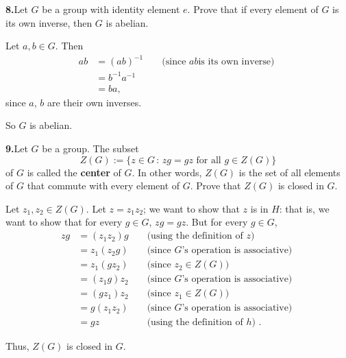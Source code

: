 \documentclass[10pt,]{book}
\newcommand{\terminology}[1]{\textbf{#1}}
\theoremstyle{plain}
\theoremstyle{definition}
\theoremstyle{definition}
\theoremstyle{definition}
\theoremstyle{definition}
\numberwithin{equation}{section}
\newcommand{\amp}{&}
\begin{document}
\par\smallskip
\noindent\textbf{8.}\quad{}Let \(G\) be a group with identity element \(e\). Prove that if every element of \(G\) is its own inverse, then \(G\) is abelian.%
\par\smallskip
Let \(a,b\in G\). Then%
%
\begin{align*}
ab\amp =(ab)^{-1}\amp \amp \text{ (since \(ab\)
is its own inverse) }\\
\amp =b^{-1}a^{-1}\amp \amp\\
\amp =ba, \amp
\end{align*}
since \(a\), \(b\) are their own inverses.%
\par
So \(G\) is abelian.%
\par\smallskip
\noindent\textbf{9.}\quad{}Let \(G\) be a group. The subset%
\begin{equation*}
Z(G):=\{z \in G\,:\, zg=gz \mbox{ for all } g\in Z(G)\}
\end{equation*}
of \(G\) is called the \terminology{center} of \(G\). In other words, \(Z(G)\) is the set of all elements of \(G\) that commute with every element of \(G\). Prove that \(Z(G)\) is closed in \(G\).%
\par\smallskip
Let \(z_1, z_2\in Z(G)\). Let \(z=z_1z_2\); we want to show that \(z\) is in \(H\): that is, we want to show that for every \(g\in G\), \(zg=gz\). But for every \(g\in G\),%
\begin{align*}
zg\amp =(z_1z_2)g\amp \amp  \text{ (using the definition of \(z\)) }\\
\amp =z_1(z_2g)\amp \amp  \text{ (since \(G\)'s operation is associative) }\\
\amp =z_1(gz_2)\amp \amp  \text{ (since \(z_2\in Z(G)\)) }\\
\amp =(z_1g)z_2 \amp \amp  \text{ (since \(G\)'s operation is associative) }\\
\amp =(gz_1)z_2 \amp \amp  \text{ (since \(z_1\in Z(G)\)) }\\
\amp =g(z_1z_2)\amp \amp   \text{ (since \(G\)'s operation is associative) }\\
\amp =gz \amp \amp  \text{ (using the definition of \(h\)) } .
\end{align*}
%
\par
Thus, \(Z(G)\) is closed in \(G\).%
\par\smallskip
\end{document}

